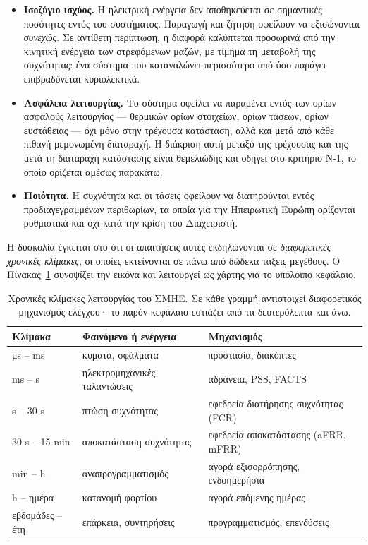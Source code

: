 \begin{itemize}
\item \textbf{Ισοζύγιο ισχύος.} Η ηλεκτρική ενέργεια δεν αποθηκεύεται σε σημαντικές
      ποσότητες εντός του συστήματος. Παραγωγή και ζήτηση οφείλουν να εξισώνονται
      \emph{συνεχώς}. Σε αντίθετη περίπτωση, η διαφορά καλύπτεται προσωρινά από την
      κινητική ενέργεια των στρεφόμενων μαζών, με τίμημα τη μεταβολή της συχνότητας: ένα
      σύστημα που καταναλώνει περισσότερο από όσο παράγει επιβραδύνεται κυριολεκτικά.
\item \textbf{Ασφάλεια λειτουργίας.} Το σύστημα οφείλει να παραμένει εντός των ορίων
      ασφαλούς λειτουργίας — θερμικών ορίων στοιχείων, ορίων τάσεων, ορίων ευστάθειας —
      όχι μόνο στην τρέχουσα κατάσταση, αλλά και μετά από κάθε πιθανή μεμονωμένη διαταραχή.
      Η διάκριση αυτή μεταξύ της τρέχουσας και της μετά τη διαταραχή κατάστασης είναι
      θεμελιώδης και οδηγεί στο κριτήριο N-1, το οποίο ορίζεται αμέσως παρακάτω.
\item \textbf{Ποιότητα.} Η συχνότητα και οι τάσεις οφείλουν να διατηρούνται εντός
      προδιαγεγραμμένων περιθωρίων, τα οποία για την Ηπειρωτική Ευρώπη ορίζονται
      ρυθμιστικά και όχι κατά την κρίση του Διαχειριστή.
\end{itemize}

Η δυσκολία έγκειται στο ότι οι απαιτήσεις αυτές εκδηλώνονται σε \emph{διαφορετικές χρονικές
κλίμακες}, οι οποίες εκτείνονται σε πάνω από δώδεκα τάξεις μεγέθους. Ο
Πίνακας~\ref{tab:chronikes-klimakes} συνοψίζει την εικόνα και λειτουργεί ως χάρτης για το
υπόλοιπο κεφάλαιο.

\begin{table}[!htbp]
\centering
\begin{tabular}{lll}
\hline
Κλίμακα & Φαινόμενο ή ενέργεια & Μηχανισμός \\
\hline
μs -- ms   & κύματα, σφάλματα           & προστασία, διακόπτες \\
ms -- s    & ηλεκτρομηχανικές ταλαντώσεις & αδράνεια, PSS, FACTS \\
s -- 30 s  & πτώση συχνότητας            & εφεδρεία διατήρησης συχνότητας (FCR) \\
30 s -- 15 min & αποκατάσταση συχνότητας & εφεδρεία αποκατάστασης (aFRR, mFRR) \\
min -- h   & αναπρογραμματισμός          & αγορά εξισορρόπησης, ενδοημερήσια \\
h -- ημέρα & κατανομή φορτίου            & αγορά επόμενης ημέρας \\
εβδομάδες -- έτη & επάρκεια, συντηρήσεις & προγραμματισμός, επενδύσεις \\
\hline
\end{tabular}
\caption{Χρονικές κλίμακες λειτουργίας του ΣΜΗΕ. Σε κάθε γραμμή αντιστοιχεί διαφορετικός
μηχανισμός ελέγχου· το παρόν κεφάλαιο εστιάζει από τα δευτερόλεπτα και άνω.}
\label{tab:chronikes-klimakes}
\end{table}

